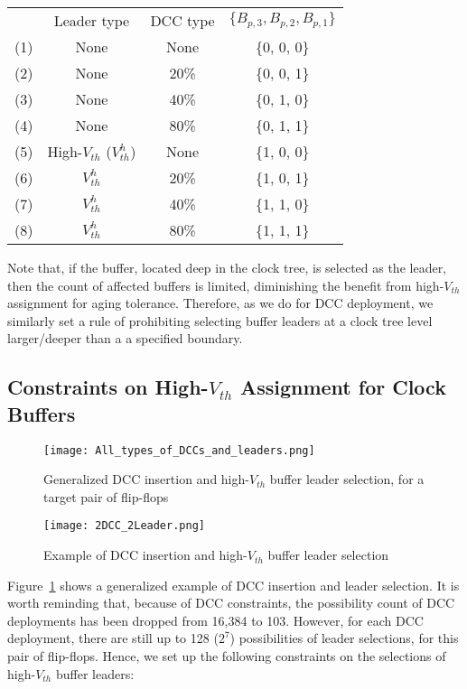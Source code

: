 {\small
\begin{tabular}{  c  c  c  c  }
  	 & Leader type & DCC type & $\{B_{p,3}, B_{p,2}, B_{p,1}\}$ \\ 
  	(1)\quad & None & None & \{0, 0, 0\} \\ 
  	(2)\quad & None &20\% &  \{0, 0, 1\} \\ 
  	(3)\quad & None &40\% &  \{0, 1, 0\} \\ 
  	(4)\quad & None &80\% &  \{0, 1, 1\} \\ 
	(5)\quad & High-$V_{th}$ ($V_{th}^h$) & None & \{1, 0, 0\} \\ 
  	(6)\quad & $V_{th}^h$ & 20\% &  \{1, 0, 1\} \\ 
  	(7)\quad & $V_{th}^h$ & 40\% &  \{1, 1, 0\} \\ 
  	(8)\quad & $V_{th}^h$ & 80\% &  \{1, 1, 1\} \\ 
\end{tabular}}

Note that, if the buffer, located deep in the clock tree, is selected as the leader, then the count of affected buffers is limited, diminishing the benefit from high-$V_{th}$ assignment for aging tolerance. Therefore, as we do for DCC deployment, we similarly set a rule of prohibiting selecting buffer leaders at a clock tree level larger/deeper than a a specified boundary.
\subsection{Constraints on High-$V_{th}$ Assignment for Clock Buffers}
\begin{figure}
	\centering
	\texttt{[image: All\_types\_of\_DCCs\_and\_leaders.png]} %
	\caption{Generalized DCC insertion and high-$V_{th}$ buffer leader selection, for a target pair of flip-flops}
	\label{fig:leadertype}
\end{figure}
\begin{figure}[t!]
    \centering
    \texttt{[image: 2DCC\_2Leader.png]} %
    \caption{Example of DCC insertion and high-$V_{th}$ buffer leader selection}
    \label{fig:2dcc2leader}
\end{figure}

Figure~\ref{fig:leadertype} shows a generalized example of DCC insertion and leader selection. It is worth reminding that, because of DCC constraints, the possibility count of DCC deployments has been dropped from 16,384 to 103. However, for each DCC deployment, there are still up to 128 ($2^7$) possibilities of leader selections, for this pair of flip-flops. Hence, we set up the following constraints on the selections of high-$V_{th}$ buffer leaders:

